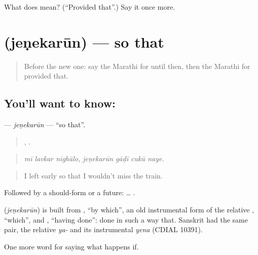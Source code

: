 \begin{tcolorbox}[breakable,colback=teal!4,colframe=teal!35!black,title={Before you move on}]
What does  mean? (\textquotedblleft{}Provided that\textquotedblright{}.) Say it once more.
\end{tcolorbox}
\section[\texorpdfstring{\mr{जेणेकरून} (jeṇekarūn)}{जेणेकरून (jeṇekarūn)}]{ (jeṇekarūn) — so that}

\label{lesson:MR-C381-jenekarun}



\begin{quote}
Before the new one: say the Marathi for until then, then the Marathi for provided that.
\end{quote}

\subsection*{You'll want to know: }
\textbf{} — \emph{jeṇekarūn} — \textquotedblleft{}so that\textquotedblright{}.

\begin{quote}
  ,    .
\end{quote}

\begin{quote}
\emph{mī lavkar nighālo, jeṇekarūn gāḍī cukū naye.}
\end{quote}

\begin{quote}
I left early so that I wouldn't miss the train.
\end{quote}

Followed by a should-form or a future:  … .

\begin{cousinweb}
\textbf{} (\emph{jeṇekarūn}) is built from , \textquotedblleft{}by which\textquotedblright{}, an old instrumental form of the relative , \textquotedblleft{}which\textquotedblright{}, and , \textquotedblleft{}having done\textquotedblright{}: done in such a way that. Sanskrit had the same pair, the relative \emph{ya-} and its instrumental \emph{yena} (CDIAL 10391).
\end{cousinweb}

\begin{grammarlens}[title={What you've built}]
One more word for saying what happens if.
\end{grammarlens}

